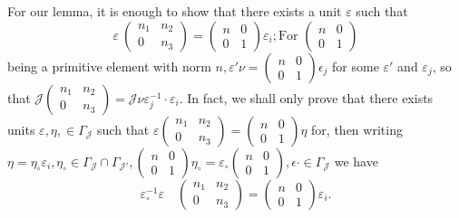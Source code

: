 For our lemma, it is enough to show that there exists a unit
$\varepsilon$ such that\pageoriginale  
$$
\varepsilon~ \begin{pmatrix} n_1 & n_2 \\ 0 & n_3 \end{pmatrix}
= \begin{pmatrix} n & 0 \\ 0 & 1 \end{pmatrix} \varepsilon _ i ;
\text{For }\begin{pmatrix} n & 0 \\ 0 & 1 \end{pmatrix} 
$$
being a primitive element with norm $n, \varepsilon ' \nu
= \begin{pmatrix} n & 0 \\ 0 & 1 \end{pmatrix} {\epsilon _j }$
for some $\varepsilon'$ and $\varepsilon_j$, so that
$\mathcal{J} \begin{pmatrix} n_1  & n_2 \\ 0 & n_3 \end{pmatrix}
=\mathcal{J} \nu \varepsilon^{-1}_{ j}\cdot \varepsilon_i $. In fact,
we shall only prove that there exists units $\varepsilon,  \eta, \in
\Gamma_{\mathcal{J}}$ such that ${\varepsilon}{ \begin{pmatrix} n_1 &
    n_2 \\ 0 & n_3 \end{pmatrix}= \begin{pmatrix} n & 0 \\ 0 &
    1 \end{pmatrix}} \eta $ for, then writing $\eta = \eta _\circ
\varepsilon_i, \eta _\circ \in \Gamma_{\mathcal{J}}\cap \Gamma_{
  \mathcal{J}'},  \begin{pmatrix} n & 0 \\ 0 & 1 \end{pmatrix} \eta
_\circ = \varepsilon_\circ \begin{pmatrix} n & 0 \\ 0 &
  1 \end{pmatrix},  \epsilon \cdot \in \Gamma _\mathcal{J}$ 
we have 
$$
\varepsilon^{-1}_\circ  \varepsilon \quad { \begin{pmatrix} n_1 & n_2 \\ 0
    & n_3 \end{pmatrix} = \begin{pmatrix} n & 0 \\ 0 &
    1 \end{pmatrix}} \varepsilon_i.   
$$

